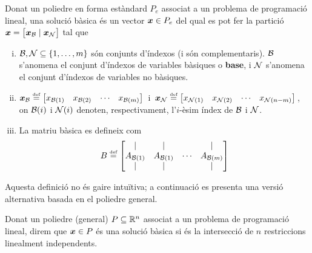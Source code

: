 \begin{defi}
	Donat un poliedre en forma estàndard $P_e$ associat a un problema de programació lineal, una solució bàsica és un vector $\boldsymbol{x}\in P_e$ del qual es pot fer la partició $\boldsymbol{x} = \left[\boldsymbol{x}_{\mathcal{B}}\mid\boldsymbol{x}_{\mathcal{N}}\right]$ tal que
	\begin{enumerate}[i)]
		\item $\mathcal{B},\mathcal{N}\subseteq\{1,\ldots,m \}$ són conjunts d'índexos (i són complementaris). $\mathcal{B}$ s'anomena el conjunt d'índexos de variables bàsiques o \textbf{base}, i $\mathcal{N}$ s'anomena el conjunt d'índexos de variables no bàsiques.
		\item $\boldsymbol{x}_{\mathcal{B}} \stackrel{\text{\tiny def}}{=} 
		\begin{bmatrix}x_{\mathcal{B}(1)} & x_{\mathcal{B}(2)} & \cdots & x_{\mathcal{B}(m)}\end{bmatrix}\,$
		i
		$\,\boldsymbol{x}_{\mathcal{N}} \stackrel{\text{\tiny def}}{=} 
		\begin{bmatrix}x_{\mathcal{N}(1)} & x_{\mathcal{N}(2)} & \cdots & x_{\mathcal{N}(n-m)}\end{bmatrix}\,$, on $\mathcal{B}(i)$ i $\mathcal{N}(i)$ denoten, respectivament, l'$i$-èsim índex de $\mathcal{B}$ i $\mathcal{N}$.
		\item La matriu bàsica es defineix com 
		\[
			B \stackrel{\text{\tiny def}}{=}
			\begin{bmatrix}
			\arrowvert& 	\arrowvert& 	  & 	\arrowvert\\
			A_{\mathcal{B}(1)}&		A_{\mathcal{B}(1)}&	\cdots&		A_{\mathcal{B}(m)}\\
			\arrowvert& 	\arrowvert& 	  & 	\arrowvert\\
			\end{bmatrix}
		\]
	\end{enumerate}
\end{defi}

Aquesta definició no és gaire intuïtiva; a continuació es presenta una versió alternativa basada en el poliedre general.

\begin{defi}
	Donat un poliedre (general) $P\subseteq\mathbb{R}^n$ associat a un problema de programació lineal, direm que $\boldsymbol{x}\in P$ és una solució bàsica si és la intersecció de $n$ restriccions linealment independents.
\end{defi}

